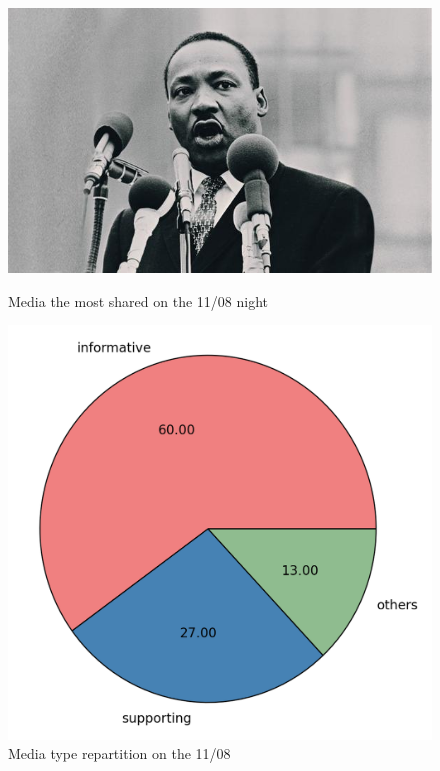 \documentclass[a4paper,12pt]{report}
\begin{document}
\begin{figure}[H]
\begin{minipage}[t]{0.45\textwidth}
\begin{center}
	\includegraphics[width=\textwidth]{images/photos/mlk.jpg}
	\caption{Media the most shared on the 11/08 night}
\end{center}
\end{minipage}
\hfill
\begin{minipage}[t]{0.4\textwidth}
\begin{center}
	\includegraphics[width=\textwidth]{images/plots/pies/pie_medias.png}
	\caption{Media type repartition on the 11/08}
	\label{typeRepartitionMedias}
\end{center}
\end{minipage}
\end{figure}
\end{document}
